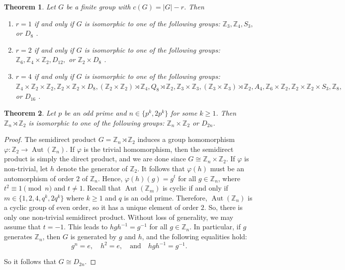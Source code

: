 \documentclass[a4paper,11pt]{amsart}
\numberwithin{equation}{section}
\numberwithin{equation}{subsection}
\newtheorem{theorem}{Theorem}[section]
\begin{document}
\begin{theorem}\label{c(G)=|G|-r} 
    Let $G$ be a finite group with $c(G)=  |G|-r$. Then
    \begin{enumerate}
        \item $r=1$  if and only if $G$  is isomorphic to one of the following groups:  $\mathbb{Z}_3, \mathbb{Z}_4, S_3,$ or $D_8$ .  

        \item  $r=2$ if and only if  $G$  is isomorphic to one of the following groups:  $\mathbb{Z}_{6}, \mathbb{Z}_{4}\times \mathbb{Z}_2, D_{12},$ or $ \mathbb{Z}_2\times D_{8}$ . 

        \item  $r=4$ if and only if $G$  is isomorphic to one of the following groups:  $\mathbb{Z}_{4}\times \mathbb{Z}_{2}\times \mathbb{Z}_{2}, \mathbb{Z}_{2}\times \mathbb{Z}_{2}\times D_8, (\mathbb{Z}_{2}\times \mathbb{Z}_{2})\rtimes \mathbb{Z}_{4}, Q_{8}\rtimes\mathbb{Z}_{2}, \mathbb{Z}_{3}\times\mathbb{Z}_{3}, (\mathbb{Z}_{3}\times\mathbb{Z}_{3})\rtimes \mathbb{Z}_{2}, A_{4}, \mathbb{Z}_{6}\times\mathbb{Z}_{2}, \mathbb{Z}_{2}\times\mathbb{Z}_{2}\times S_3, \mathbb{Z}_{8}, $ or $ D_{16}$ . 
    \end{enumerate}
   
\end{theorem} 

 \begin{theorem}\label{p^k or 2p^k}
     Let $p$ be an odd prime and $n\in\{p^{k},2p^{k}\}$ for some $k\geq 1$. Then $\mathbb{Z}_{n}\rtimes \mathbb{Z}_{2}$  is isomorphic to one of the following groups:  $\mathbb{Z}_{n}\times\mathbb{Z}_{2}$ or $D_{2n}$.
 \end{theorem}
 \begin{proof}
     The semidirect product $G = \mathbb{Z}_n \rtimes \mathbb{Z}_2$ induces a group homomorphism $\varphi : \mathbb{Z}_2 \to \operatorname{Aut}(\mathbb{Z}_n)$. If $\varphi$ is the trivial homomorphism, then the semidirect product is simply the direct product, and we are done since $G \cong \mathbb{Z}_n \times \mathbb{Z}_2$. If $\varphi$ is non-trivial, let $h$ denote the generator of $\mathbb{Z}_2$. It follows that $\varphi(h)$ must be an automorphism of order $2$ of $\mathbb{Z}_n$. Hence, $\varphi(h)(g) = g^t$ for all $g \in \mathbb{Z}_n$, where $t^2 \equiv 1 \pmod{n}$ and $t \neq 1$. Recall that $\operatorname{Aut}(\mathbb{Z}_m)$ is cyclic if and only if $m \in \{1, 2, 4, q^k, 2q^k\}$ where $k \ge 1$ and $q$ is an odd prime. Therefore, $\operatorname{Aut}(\mathbb{Z}_n)$ is a cyclic group of even order, so it has a unique element of order $2$. So, there is only one non-trivial semidirect product. Without loss of generality, we may assume that $t = -1$. This leads to $hgh^{-1} = g^{-1}$ for all $g \in \mathbb{Z}_n$. In particular, if $g$ generates $\mathbb{Z}_n$, then $G$ is generated by $g$ and $h$, and the following equalities hold: 
\[
g^n = e, \quad h^2 = e, \quad \text{and} \quad hgh^{-1} = g^{-1}.
\]

So it follows that $G \cong D_{2n}$.
 \end{proof}
\end{document}
